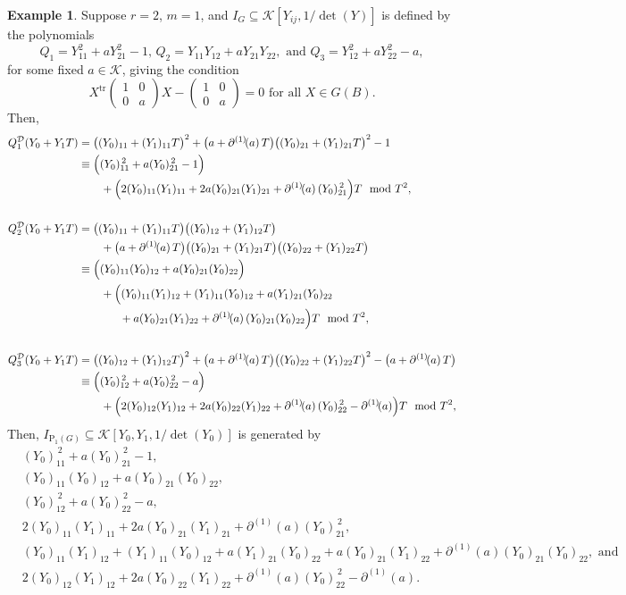 \documentclass[10pt,a4paper]{amsart}
\theoremstyle{plain} %
\theoremstyle{definition}
\newtheorem{Example}[Theorem]{Example}
\theoremstyle{remark}
\newcommand{\cK}{\mathcal{K}}   %
\newcommand{\rP}[1]{\mathrm{P}_{\!#1}}
\newcommand{\tr}{\operatorname{tr}}
\newcommand{\hd}[2]{\partial^{(#1)}\!\!\left(#2\right)} %
\newcommand{\D}{\mathcal{D}} %
\numberwithin{equation}{subsection}
\begin{document}
\begin{Example}
Suppose $r=2$, $m=1$, and $I_G \subseteq \cK[Y_{ij}, 1/\det(Y)]$ is defined by the polynomials 
\[
Q_1=Y_{11}^2+aY_{21}^2 -1, \, Q_2=Y_{11}Y_{12}+aY_{21}Y_{22}, \text{ and } Q_3=Y_{12}^2+aY_{22}^2 -a,
\]
for some fixed $a\in \cK$, giving the condition
\[
X^{\tr}\begin{pmatrix}
1 & 0\\
0 & a
\end{pmatrix} X - \begin{pmatrix}
1 & 0\\
0 & a
\end{pmatrix}=0 \text{ for all } X\in G(B).
\]
Then, 
\begin{align*}
Q_1^\D(Y_0+ Y_1T) &= \bigl((Y_0)_{11} + (Y_1)_{11}T\bigr)^{2} + \bigl(a + \hd{1}{a}T\bigr)\bigl((Y_0)_{21} + (Y_1)_{21}T\bigr)^2 -1 \\
&\equiv \Bigl((Y_0)_{11}^{\,2}+a(Y_0)_{21}^{\,2}-1\Bigr) \\
& \qquad+ \Bigl(2(Y_0)_{11}(Y_1)_{11}+2a(Y_0)_{21}(Y_1)_{21} +\hd{1}{a}(Y_0)_{21}^{\,2}\Bigr)T \mod{T^2},\\
&\\
Q_2^\D(Y_0+ Y_1T) &= \bigl((Y_0)_{11}+(Y_1)_{11}T\bigr)\bigl((Y_0)_{12}+(Y_1)_{12}T\bigr) \\
&\qquad +\bigl(a +\hd{1}{a}T\bigr)\bigl((Y_0)_{21}+(Y_1)_{21}T\bigr)\bigl((Y_0)_{22}+(Y_1)_{22}T\bigr)\\
&\equiv \Bigl((Y_0)_{11}(Y_0)_{12} + a(Y_0)_{21}(Y_0)_{22}\Bigr) \\
&\qquad + \Bigl((Y_0)_{11}(Y_1)_{12}+(Y_1)_{11}(Y_0)_{12}+a(Y_1)_{21}(Y_0)_{22}\\ &\hspace{1.3cm} + a(Y_0)_{21}(Y_1)_{22} + \hd{1}{a}(Y_0)_{21}(Y_0)_{22}\Bigr) T
\mod{T^2},\\
& \\
Q_3^\D(Y_0+ Y_1T) &= \bigl((Y_0)_{12} + (Y_1)_{12}T\bigr)^{2} + \bigl(a + \hd{1}{a}T\bigr)\bigl((Y_0)_{22} + (Y_1)_{22}T\bigr)^2 - \bigl(a + \hd{1}{a}T\bigr) \\
&\equiv \Bigl((Y_0)_{12}^{\,2}+a(Y_0)_{22}^{\,2}-a\Bigr)\\
&\qquad + \Bigl(2(Y_0)_{12}(Y_1)_{12}+2a(Y_0)_{22}(Y_1)_{22}
+\hd{1}{a}(Y_0)_{22}^{\,2}- \hd{1}{a}\Bigr)T \mod{T^2},
\end{align*}
Then, $I_{\rP{1}(G)} \subseteq \cK[Y_0, Y_1, 1/\det(Y_0)]$ is generated by 
\begin{align*}
& (Y_0)_{11}^{\,2}+a(Y_0)_{21}^{\,2}-1, \\
&(Y_0)_{11}(Y_0)_{12} + a(Y_0)_{21}(Y_0)_{22},\\
&(Y_0)_{12}^{\,2}+a(Y_0)_{22}^{\,2}-a, \\
 & 2(Y_0)_{11}(Y_1)_{11}+2a(Y_0)_{21}(Y_1)_{21} +\hd{1}{a}(Y_0)_{21}^{\,2}, \\
&(Y_0)_{11}(Y_1)_{12}+(Y_1)_{11}(Y_0)_{12}+a(Y_1)_{21}(Y_0)_{22}+ a(Y_0)_{21}(Y_1)_{22} + \hd{1}{a}(Y_0)_{21}(Y_0)_{22}, \text{ and } \\
&2(Y_0)_{12}(Y_1)_{12}+2a(Y_0)_{22}(Y_1)_{22} +\hd{1}{a}(Y_0)_{22}^{\,2}- \hd{1}{a}.
\end{align*}

\end{Example}
\end{document}
